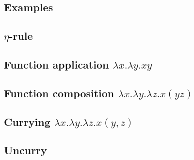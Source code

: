 \documentclass{article}
\theoremstyle{definition}
\begin{document}
\newpage
\begin{appendices}
		
    \begin{landscape}
    	\section{Examples}
        \subsection{\texorpdfstring{$\eta$}{}-rule}  \label{ex3}
        \subsection{Function application \texorpdfstring{$\lambda x . \lambda y . x y$}{}}  \label{ex2}
        \newpage\subsection{Function composition \texorpdfstring{$\lambda x . \lambda y . \lambda z . x ( y z)$}{}}  \label{ex7}        
        \newpage\subsection{Currying \texorpdfstring{$\lambda x . \lambda y . \lambda z . x (y, z)$}{}}  \label{ex8}
        \newpage\subsection{Uncurry}  \label{ex9}
        
    \end{landscape}
\end{appendices}
\end{document}
